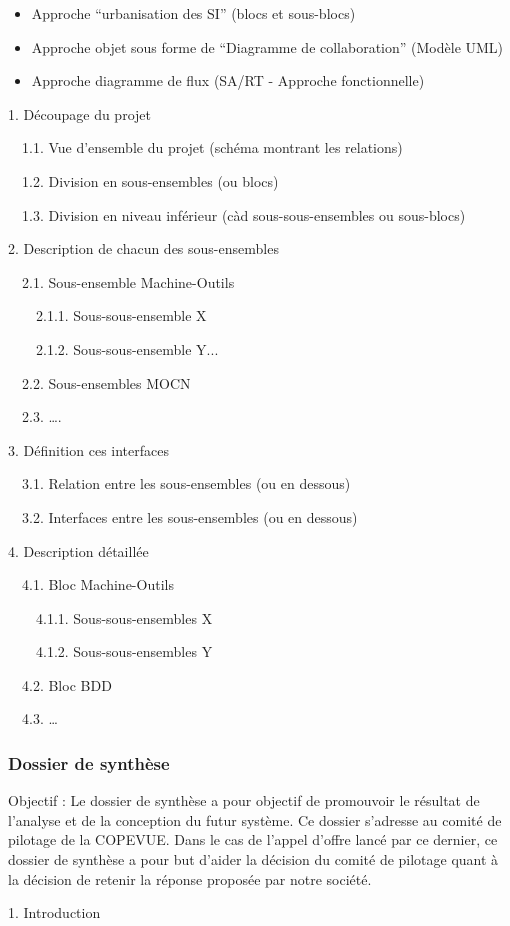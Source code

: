 \documentclass{mise_en_page}
\begin{document}
\begin{itemize}
\item Approche “urbanisation des SI” (blocs et sous-blocs)
\item Approche objet sous forme de “Diagramme de collaboration” (Modèle
UML)
\item Approche diagramme de flux (SA/RT - Approche fonctionnelle)
\end{itemize}
1. Découpage du projet

\ \ 1.1. Vue d’ensemble du projet (schéma montrant les relations)

\ \ 1.2. Division en sous-ensembles (ou blocs)

\ \ 1.3. Division en niveau inférieur (càd sous-sous-ensembles ou
sous-blocs)

2. Description de chacun des sous-ensembles

\ \ 2.1. Sous-ensemble Machine-Outils

\ \ \ \ 2.1.1. Sous-sous-ensemble X

\ \ \ \ 2.1.2. Sous-sous-ensemble Y...

\ \ 2.2. Sous-ensembles MOCN

\ \ 2.3. ….

3. Définition ces interfaces

\ \ 3.1. Relation entre les sous-ensembles (ou en dessous)

\ \ 3.2. Interfaces entre les sous-ensembles (ou en dessous)

4. Description détaillée

\ \ 4.1. Bloc Machine-Outils

\ \ \ \ 4.1.1. Sous-sous-ensembles X

\ \ \ \ 4.1.2. Sous-sous-ensembles Y

\ \ 4.2. Bloc BDD

\ \ 4.3. …




\subsubsection{Dossier de synthèse}
Objectif : Le dossier de synthèse a pour objectif de promouvoir le
résultat de l’analyse et de la conception du futur système. Ce dossier
s’adresse au comité de pilotage de la COPEVUE. Dans le cas de l’appel
d’offre lancé par ce dernier, ce dossier de synthèse a pour but d’aider
la décision du comité de pilotage quant à la décision de retenir la
réponse proposée par notre société.

1. Introduction
\end{document}
